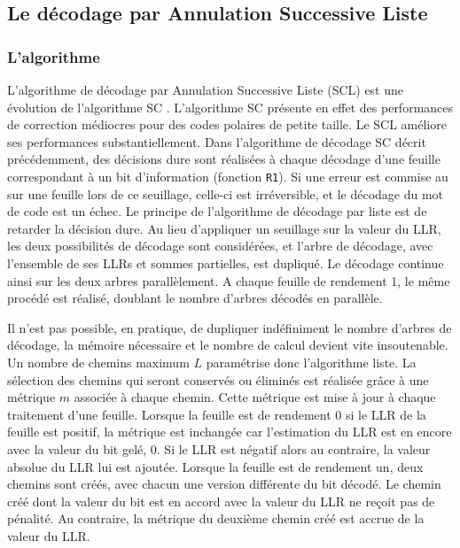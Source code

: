 \subsection{Le décodage par Annulation Successive Liste}
\subsubsection{L'algorithme}
L'algorithme de décodage par Annulation Successive Liste (SCL) est une évolution de l'algorithme SC \cite{tal_how_2013}. L'algorithme SC présente en effet des performances de correction médiocres pour des codes polaires de petite taille. Le SCL améliore ses performances substantiellement. Dans l'algorithme de décodage SC décrit précédemment, des décisions dure sont réalisées à chaque décodage d'une feuille correspondant à un bit d'information (fonction \texttt{R1}). Si une erreur est commise au sur une feuille lors de ce seuillage, celle-ci est irréversible, et le décodage du mot de code est un échec. Le principe de l'algorithme de décodage par liste est de retarder la décision dure. Au lieu d'appliquer un seuillage sur la valeur du LLR, les deux possibilités de décodage sont considérées, et l'arbre de décodage, avec l'ensemble de ses LLRs et sommes partielles, est dupliqué. Le décodage continue ainsi sur les deux arbres parallèlement. A chaque feuille de rendement 1, le même procédé est réalisé, doublant le nombre d'arbres décodés en parallèle.

Il n'est pas possible, en pratique, de dupliquer indéfiniment le nombre d'arbres de décodage, la mémoire nécessaire et le nombre de calcul devient vite insoutenable. Un nombre de chemins maximum $L$ paramétrise donc l'algorithme liste. La sélection des chemins qui seront conservés ou éliminés est réalisée grâce à une métrique $m$ associée à chaque chemin. Cette métrique est mise à jour à chaque traitement d'une feuille. Lorsque la feuille est de rendement 0 si le LLR de la feuille est positif, la métrique est inchangée car l'estimation du LLR est en encore avec la valeur du bit gelé, 0. Si le LLR est négatif alors au contraire, la valeur absolue du LLR lui est ajoutée. Lorsque la feuille est de rendement un, deux chemins sont créés, avec chacun une version différente du bit décodé. Le chemin créé dont la valeur du bit est en accord avec la valeur du LLR ne reçoit pas de pénalité. Au contraire, la métrique du deuxième chemin créé est accrue de la valeur du LLR.

